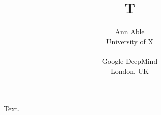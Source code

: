 \documentclass{article}
\title{T}
\author{Ann Able \\
University of X \\
\\
Google DeepMind \\
London, UK}
\begin{document}
\maketitle
Text.
\end{document}
